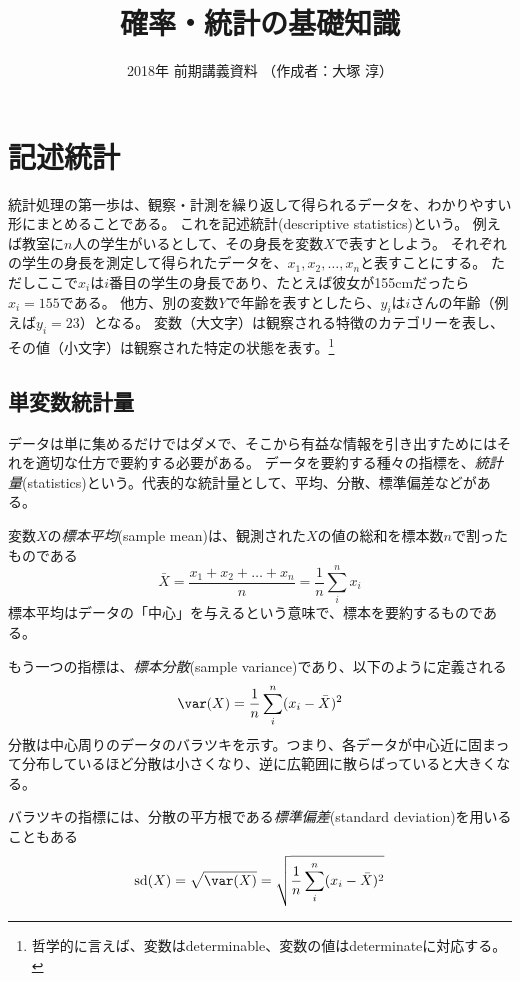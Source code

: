 \documentclass{jsarticle}
\title{確率・統計の基礎知識}
\author{2018年 前期講義資料 （作成者：大塚 淳）}
\date{ }                                           %
\begin{document}
\maketitle


\section{記述統計}
統計処理の第一歩は、観察・計測を繰り返して得られるデータを、わかりやすい形にまとめることである。
これを記述統計(descriptive statistics)という。
例えば教室に$n$人の学生がいるとして、その身長を変数$X$で表すとしよう。
それぞれの学生の身長を測定して得られたデータを、$x_1, x_2, \dots, x_n$と表すことにする。
ただしここで$x_i$は$i$番目の学生の身長であり、たとえば彼女が155cmだったら$x_i = 155$である。
他方、別の変数$Y$で年齢を表すとしたら、$y_i$は$i$さんの年齢（例えば$y_i = 23$）となる。
変数（大文字）は観察される特徴のカテゴリーを表し、その値（小文字）は観察された特定の状態を表す。\footnote{哲学的に言えば、変数はdeterminable、変数の値はdeterminateに対応する。}

\subsection{単変数統計量}
データは単に集めるだけではダメで、そこから有益な情報を引き出すためにはそれを適切な仕方で要約する必要がある。
データを要約する種々の指標を、\emph{統計量}(statistics)という。代表的な統計量として、平均、分散、標準偏差などがある。

変数$X$の\emph{標本平均}(sample mean)は、観測された$X$の値の総和を標本数$n$で割ったものである
\[
 \bar{X} = \frac{x_1 + x_2 + \dots + x_n}{n} = \frac{1}{n} \sum_i^n x_i 
\]
標本平均はデータの「中心」を与えるという意味で、標本を要約するものである。

もう一つの指標は、\emph{標本分散}(sample variance)であり、以下のように定義される
\[
 \var(X) = \frac{1}{n} \sum_i^n (x_i - \bar{X})^2
\]
分散は中心周りのデータのバラツキを示す。つまり、各データが中心近に固まって分布しているほど分散は小さくなり、逆に広範囲に散らばっていると大きくなる。

バラツキの指標には、分散の平方根である\emph{標準偏差}(standard deviation)を用いることもある
\[
 \textrm{sd}(X) = \sqrt{\var(X)} = \sqrt{ \frac{1}{n} \sum_i^n (x_i - \bar{X})^2 }
\]
\end{document}
